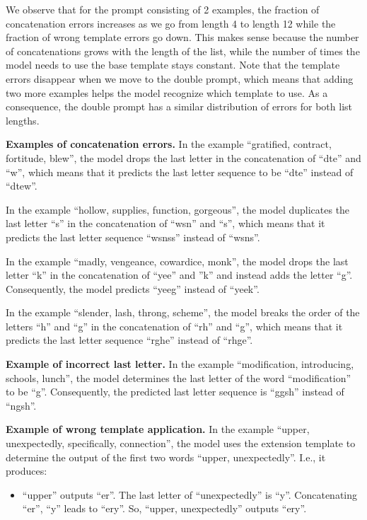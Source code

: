 We observe that for the prompt consisting of 2 examples, the fraction of concatenation errors increases as we go from length 4 to length 12 while the fraction of wrong template errors go down. This makes sense because the number of concatenations grows with the length of the list, while the number of times the model needs to use the base template stays constant. Note that the template errors disappear when we move to the double prompt, which means that adding two more examples helps the model recognize which template to use. As a consequence, the double prompt has a similar distribution of errors for both list lengths.

\textbf{Examples of concatenation errors.}
In the example ``gratified, contract, fortitude, blew'', the model drops the last letter in the concatenation of ``dte'' and ``w'', which means that it predicts the last letter sequence to be ``dte'' instead of ``dtew''.

In the example ``hollow, supplies, function, gorgeous'', the model duplicates the last letter ``s'' in the concatenation of ``wsn'' and ``s'', which means that it predicts the last letter sequence ``wsnss'' instead of ``wsns''.

In the example ``madly, vengeance, cowardice, monk'', the model drops the last letter ``k'' in the concatenation of ``yee'' and ''k'' and instead adds the letter ``g''. Consequently, the model predicts ``yeeg'' instead of ``yeek''.

In the example ``slender, lash, throng, scheme'', the model breaks the order of the letters ``h'' and ``g'' in the concatenation of ``rh'' and ``g'', which means that it predicts the last letter sequence ``rghe'' instead of ``rhge''.

\textbf{Example of incorrect last letter.}
In the example ``modification, introducing, schools, lunch'', the model determines the last letter of the word ``modification'' to be ``g''. Consequently, the predicted last letter sequence is ``ggsh'' instead of ``ngsh''.

\textbf{Example of wrong template application.}
In the example ``upper, unexpectedly, specifically, connection'', the model uses the extension template to determine the output of the first two words ``upper, unexpectedly''. I.e., it produces:

\begin{itemize}
    \item ``upper'' outputs ``er''. The last letter of ``unexpectedly'' is ``y''. Concatenating ``er'', ``y'' leads to ``ery''. So, ``upper, unexpectedly'' outputs ``ery''.
\end{itemize}

